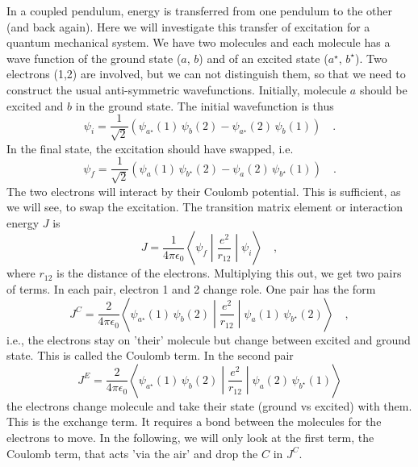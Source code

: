 In a coupled pendulum, energy is transferred from one pendulum to the other (and back again). Here we will investigate this transfer of excitation for a quantum mechanical system. We have two molecules and each molecule has a wave function of the ground state ($a$, $b$) and of an excited state ($a^\star$, $b^\star$). Two electrons (1,2) are involved, but we can not distinguish them, so that we need to construct the usual anti-symmetric wavefunctions. Initially, molecule $a$ should be excited and $b$ in the ground state. The initial wavefunction is thus
\begin{equation}
   \psi_i = \frac{1}{\sqrt{2}} \left( \psi_{a^\star}(1) \,  \psi_{b}(2) -   \psi_{a^\star}(2) \,  \psi_{b}(1)\right)  \quad .
\end{equation}
In the final state, the excitation should have swapped, i.e.
\begin{equation}
   \psi_f = \frac{1}{\sqrt{2}} \left( \psi_{a}(1) \,  \psi_{b^\star}(2) -   \psi_{a}(2) \,  \psi_{b^\star}(1)\right)  \quad .
\end{equation}
The two electrons will interact by their Coulomb potential. This is sufficient, as we will see, to swap the excitation. The transition matrix element or interaction energy $J$ is
\begin{equation}
   J = \frac{1}{4 \pi \epsilon_0} \left\langle \psi_f \middle| \frac{e^2}{r_{12}} \middle| \psi_i \right\rangle \quad ,
\end{equation}
where $r_{12}$ is the distance of the electrons. Multiplying this out, we get two pairs of terms. In each pair, electron 1 and 2 change role. One pair has the form
\begin{equation}
   J^C = \frac{2}{4 \pi \epsilon_0}  \left\langle  \psi_{a^\star}(1) \,  \psi_{b}(2)\middle| \frac{e^2}{r_{12}} \middle|  \psi_{a}(1) \,  \psi_{b^\star}(2)\right\rangle \quad ,
   \label{eq:aggregate_jc_full}
\end{equation} 
i.e., the electrons stay on 'their' molecule but change between excited and ground state. This is called the Coulomb term. In the second pair
\begin{equation}
   J^E = \frac{2}{4 \pi \epsilon_0}  \left\langle \psi_{a^\star}(1) \,  \psi_{b}(2) \middle| \frac{e^2}{r_{12}} \middle|  \psi_{a}(2) \,  \psi_{b^\star}(1) \right\rangle
\end{equation} 
%
the electrons change molecule and take their state (ground vs excited) with them. This is the exchange term. It requires a bond between the molecules for the electrons to move. In the following, we will only look at the first term, the Coulomb term, that acts 'via the air' and drop the $C$ in $J^C$.





